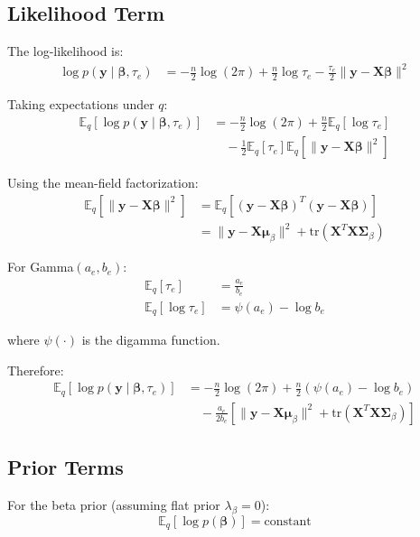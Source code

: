 \documentclass[11pt]{article}
\newcommand{\E}{\mathbb{E}}
\newcommand{\tr}{\text{tr}}
\begin{document}
\subsection{Likelihood Term}

The log-likelihood is:
\begin{align}
\log p(\bm{y} \mid \bm{\beta}, \tau_e) &= -\frac{n}{2}\log(2\pi) + \frac{n}{2}\log \tau_e - \frac{\tau_e}{2} \|\bm{y} - \bm{X}\bm{\beta}\|^2
\end{align}

Taking expectations under $q$:
\begin{align}
\E_{q}[\log p(\bm{y} \mid \bm{\beta}, \tau_e)] &= -\frac{n}{2}\log(2\pi) + \frac{n}{2}\E_q[\log \tau_e] \nonumber\\
&\quad - \frac{1}{2}\E_q[\tau_e] \E_q[\|\bm{y} - \bm{X}\bm{\beta}\|^2]
\end{align}

Using the mean-field factorization:
\begin{align}
\E_q[\|\bm{y} - \bm{X}\bm{\beta}\|^2] &= \E_q[(\bm{y} - \bm{X}\bm{\beta})^T(\bm{y} - \bm{X}\bm{\beta})] \nonumber\\
&= \|\bm{y} - \bm{X}\bm{\mu}_\beta\|^2 + \tr(\bm{X}^T\bm{X}\bm{\Sigma}_\beta)
\end{align}

For Gamma$(a_e, b_e)$:
\begin{align}
\E_q[\tau_e] &= \frac{a_e}{b_e}\\
\E_q[\log \tau_e] &= \psi(a_e) - \log b_e
\end{align}

where $\psi(\cdot)$ is the digamma function.

Therefore:
\begin{align}
\E_{q}[\log p(\bm{y} \mid \bm{\beta}, \tau_e)] &= -\frac{n}{2}\log(2\pi) + \frac{n}{2}(\psi(a_e) - \log b_e) \nonumber\\
&\quad - \frac{a_e}{2b_e} \left[\|\bm{y} - \bm{X}\bm{\mu}_\beta\|^2 + \tr(\bm{X}^T\bm{X}\bm{\Sigma}_\beta)\right]
\label{eq:exp_likelihood}
\end{align}

\subsection{Prior Terms}

For the beta prior (assuming flat prior $\lambda_\beta = 0$):
\begin{equation}
\E_{q}[\log p(\bm{\beta})] = \text{constant}
\end{equation}
\end{document}
